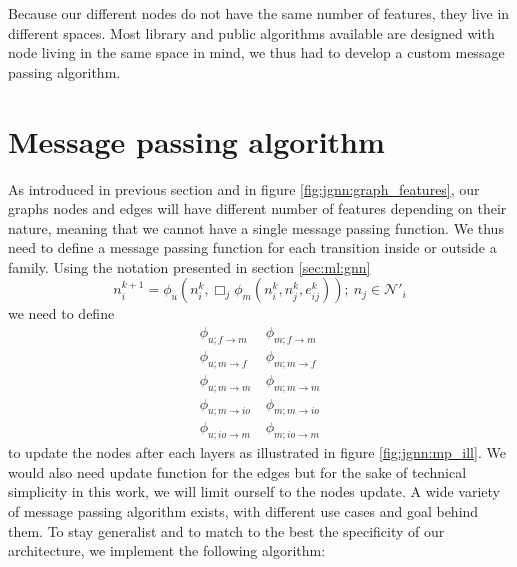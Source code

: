 \documentclass[../main.tex]{subfiles}
\begin{document}
Because our different nodes do not have the same number of features, they live in different spaces. Most library and public algorithms available are designed with node living in the same space in mind, we thus had to develop a custom message passing algorithm.

\section{Message passing algorithm}
As introduced in previous section and in figure \ref{fig:jgnn:graph_features}, our graphs nodes and edges will have different number of features depending on their nature, meaning that we cannot have a single message passing function. We thus need to define a message passing function for each transition inside or outside a family. Using the notation presented in section \ref{sec:ml:gnn}
\begin{equation}
  n_i^{k+1} = \phi_u (n_i^k, \Box_j \phi_m(n_i^k, n_j^k, e^k_{ij})); ~ n_j \in \mathcal{N}'_i
\end{equation}
we need to define
\begin{align}
  \phi_{u; f\rightarrow m} ~ &\phi_{m; f\rightarrow m} \\
  \phi_{u; m\rightarrow f} ~ &\phi_{m; m\rightarrow f} \\
  \phi_{u; m\rightarrow m} ~ &\phi_{m; m\rightarrow m} \\
  \phi_{u; m\rightarrow io} ~ &\phi_{m; m\rightarrow io} \\
  \phi_{u; io\rightarrow m} ~ &\phi_{m; io\rightarrow m}
\end{align}
to update the nodes after each layers as illustrated in figure \ref{fig:jgnn:mp_ill}. We would also need update function for the edges but for the sake of technical simplicity in this work, we will limit ourself to the nodes update. A wide variety of message passing algorithm exists, with different use cases and goal behind them. To stay generalist and to match to the best the specificity of our architecture, we implement the following algorithm:
\end{document}
